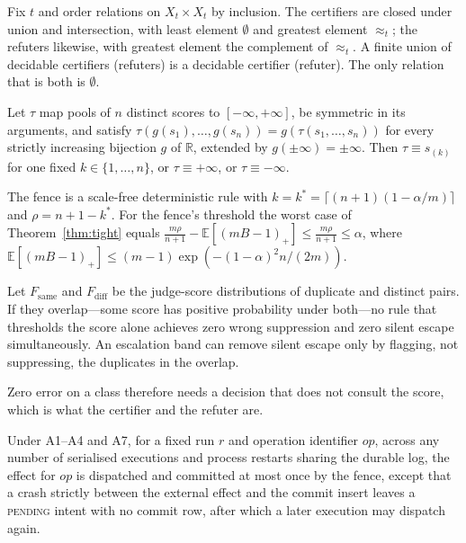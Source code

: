 \begin{proposition}[Structure]\label{prop:lattice}
Fix $t$ and order relations on $X_t\times X_t$ by inclusion. The certifiers are closed under union and intersection, with least element $\emptyset$ and greatest element $\approx_t$; the refuters likewise, with greatest element the complement of $\approx_t$. A finite union of decidable certifiers (refuters) is a decidable certifier (refuter). The only relation that is both is $\emptyset$.
\end{proposition}

\begin{lemma}\label{lem:scalefree}
Let $\tau$ map pools of $n$ distinct scores to $[-\infty,+\infty]$, be symmetric in its arguments, and satisfy $\tau(g(s_1),\dots,g(s_n))=g(\tau(s_1,\dots,s_n))$ for every strictly increasing bijection $g$ of $\mathbb{R}$, extended by $g(\pm\infty)=\pm\infty$. Then $\tau\equiv s_{(k)}$ for one fixed $k\in\{1,\dots,n\}$, or $\tau\equiv+\infty$, or $\tau\equiv-\infty$.
\end{lemma}

The fence is a scale-free deterministic rule with $k=k^\ast=\lceil(n+1)(1-\alpha/m)\rceil$ and $\rho=n+1-k^\ast$. For the fence's threshold the worst case of Theorem~\ref{thm:tight} equals $\frac{m\rho}{n+1}-\mathbb{E}[(mB-1)_+]\le\frac{m\rho}{n+1}\le\alpha$, where $\mathbb{E}[(mB-1)_+]\le(m-1)\exp(-(1-\alpha)^2n/(2m))$.

\begin{proposition}\label{prop:impossible}
Let $F_{\mathrm{same}}$ and $F_{\mathrm{diff}}$ be the judge-score distributions of duplicate and distinct pairs. If they overlap---some score has positive probability under both---no rule that thresholds the score alone achieves zero wrong suppression and zero silent escape simultaneously. An escalation band can remove silent escape only by flagging, not suppressing, the duplicates in the overlap.
\end{proposition}

Zero error on a class therefore needs a decision that does not consult the score, which is what the certifier and the refuter are.

\begin{proposition}\label{prop:amo}
Under A1--A4 and A7, for a fixed run $r$ and operation identifier $\mathit{op}$, across any number of serialised executions and process restarts sharing the durable log, the effect for $\mathit{op}$ is dispatched and committed at most once by the fence, except that a crash strictly between the external effect and the commit insert leaves a \textsc{pending} intent with no commit row, after which a later execution may dispatch again.
\end{proposition}

